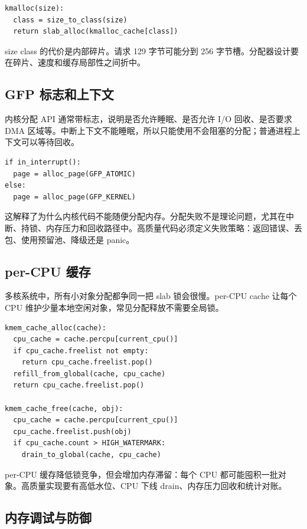 \begin{lstlisting}
kmalloc(size):
  class = size_to_class(size)
  return slab_alloc(kmalloc_cache[class])
\end{lstlisting}

size class 的代价是内部碎片。请求 129 字节可能分到 256 字节槽。分配器设计要在碎片、速度和缓存局部性之间折中。

\subsection{GFP 标志和上下文}

内核分配 API 通常带标志，说明是否允许睡眠、是否允许 I/O 回收、是否要求 DMA 区域等。中断上下文不能睡眠，所以只能使用不会阻塞的分配；普通进程上下文可以等待回收。

\begin{lstlisting}
if in_interrupt():
  page = alloc_page(GFP_ATOMIC)
else:
  page = alloc_page(GFP_KERNEL)
\end{lstlisting}

这解释了为什么内核代码不能随便分配内存。分配失败不是理论问题，尤其在中断、持锁、内存压力和回收路径中。高质量代码必须定义失败策略：返回错误、丢包、使用预留池、降级还是 panic。

\subsection{per-CPU 缓存}

多核系统中，所有小对象分配都争同一把 slab 锁会很慢。per-CPU cache 让每个 CPU 维护少量本地空闲对象，常见分配释放不需要全局锁。

\begin{lstlisting}
kmem_cache_alloc(cache):
  cpu_cache = cache.percpu[current_cpu()]
  if cpu_cache.freelist not empty:
    return cpu_cache.freelist.pop()
  refill_from_global(cache, cpu_cache)
  return cpu_cache.freelist.pop()

kmem_cache_free(cache, obj):
  cpu_cache = cache.percpu[current_cpu()]
  cpu_cache.freelist.push(obj)
  if cpu_cache.count > HIGH_WATERMARK:
    drain_to_global(cache, cpu_cache)
\end{lstlisting}

per-CPU 缓存降低锁竞争，但会增加内存滞留：每个 CPU 都可能囤积一批对象。高质量实现要有高低水位、CPU 下线 drain、内存压力回收和统计对账。

\subsection{内存调试与防御}

